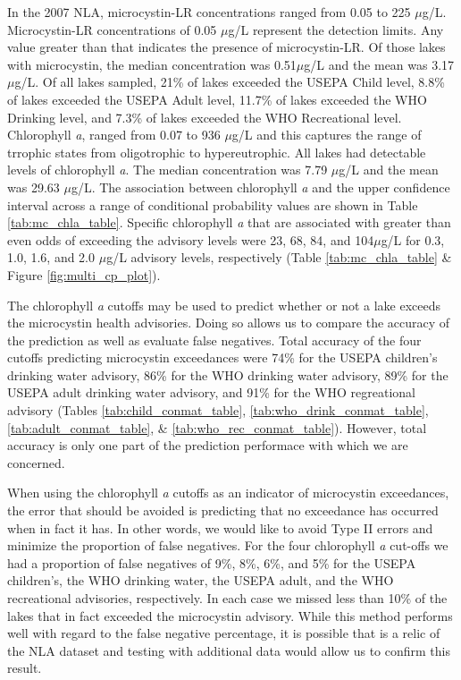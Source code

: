 \documentclass[11pt,]{article}
\begin{document}
In the 2007 NLA, microcystin-LR concentrations ranged from 0.05 to 225
\(\mu\)g/L. Microcystin-LR concentrations of 0.05 \(\mu\)g/L represent
the detection limits. Any value greater than that indicates the presence
of microcystin-LR. Of those lakes with microcystin, the median
concentration was 0.51\(\mu\)g/L and the mean was 3.17\(\mu\)g/L. Of all
lakes sampled, 21\% of lakes exceeded the USEPA Child level, 8.8\% of
lakes exceeded the USEPA Adult level, 11.7\% of lakes exceeded the WHO
Drinking level, and 7.3\% of lakes exceeded the WHO Recreational level.
Chlorophyll \emph{a}, ranged from 0.07 to 936 \(\mu\)g/L and this
captures the range of trrophic states from oligotrophic to
hypereutrophic. All lakes had detectable levels of chlorophyll \emph{a}.
The median concentration was 7.79 \(\mu\)g/L and the mean was 29.63
\(\mu\)g/L. The association between chlorophyll \emph{a} and the upper
confidence interval across a range of conditional probability values are
shown in Table \ref{tab:mc_chla_table}. Specific chlorophyll \emph{a}
that are associated with greater than even odds of exceeding the
advisory levels were 23, 68, 84, and 104\(\mu\)g/L for 0.3, 1.0, 1.6,
and 2.0 \(\mu\)g/L advisory levels, respectively (Table
\ref{tab:mc_chla_table} \& Figure \ref{fig:multi_cp_plot}).

The chlorophyll \emph{a} cutoffs may be used to predict whether or not a
lake exceeds the microcystin health advisories. Doing so allows us to
compare the accuracy of the prediction as well as evaluate false
negatives. Total accuracy of the four cutoffs predicting microcystin
exceedances were 74\% for the USEPA children's drinking water advisory,
86\% for the WHO drinking water advisory, 89\% for the USEPA adult
drinking water advisory, and 91\% for the WHO regreational advisory
(Tables \ref{tab:child_conmat_table}, \ref{tab:who_drink_conmat_table},
\ref{tab:adult_conmat_table}, \& \ref{tab:who_rec_conmat_table}).
However, total accuracy is only one part of the prediction performace
with which we are concerned.

When using the chlorophyll \emph{a} cutoffs as an indicator of
microcystin exceedances, the error that should be avoided is predicting
that no exceedance has occurred when in fact it has. In other words, we
would like to avoid Type II errors and minimize the proportion of false
negatives. For the four chlorophyll \emph{a} cut-offs we had a
proportion of false negatives of 9\%, 8\%, 6\%, and 5\% for the USEPA
children's, the WHO drinking water, the USEPA adult, and the WHO
recreational advisories, respectively. In each case we missed less than
10\% of the lakes that in fact exceeded the microcystin advisory. While
this method performs well with regard to the false negative percentage,
it is possible that is a relic of the NLA dataset and testing with
additional data would allow us to confirm this result.
\end{document}
